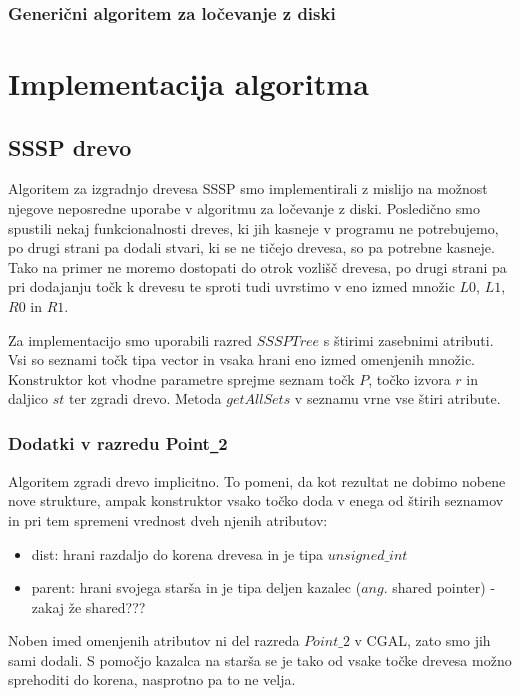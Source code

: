 \documentclass[a4paper, 12pt]{book}
\begin{document}
\subsection{Generični algoritem za ločevanje z diski}

\chapter{Implementacija algoritma}
\label{ch3}


\section{SSSP drevo}

Algoritem za izgradnjo drevesa SSSP smo implementirali z mislijo na možnost njegove neposredne uporabe v algoritmu za ločevanje z diski. Posledično smo spustili nekaj funkcionalnosti dreves, ki jih kasneje v programu ne potrebujemo, po drugi strani pa dodali stvari, ki se ne tičejo drevesa, so pa potrebne kasneje. Tako na primer ne moremo dostopati do otrok vozlišč drevesa, po drugi strani pa pri dodajanju točk k drevesu te sproti tudi uvrstimo v eno izmed množic $L0$, $L1$, $R0$ in $R1$.

Za implementacijo smo uporabili razred $SSSPTree$ s štirimi zasebnimi atributi. Vsi so seznami točk tipa vector in vsaka hrani eno izmed omenjenih množic. Konstruktor kot vhodne parametre sprejme seznam točk $P$, točko izvora $r$ in daljico $st$ ter zgradi drevo. Metoda $getAllSets$ v seznamu vrne vse štiri atribute.

\subsection{Dodatki v razredu Point\texttt{\_}2}
Algoritem zgradi drevo implicitno. To pomeni, da kot rezultat ne dobimo nobene nove strukture, ampak konstruktor vsako točko doda v enega od štirih seznamov in pri tem spremeni vrednost dveh njenih atributov:

\begin{itemize}
\item dist: hrani razdaljo do korena drevesa in je tipa $unsigned\texttt{\_}int$
\item parent: hrani svojega starša in je tipa deljen kazalec ($ang.$ shared pointer) - zakaj že shared???
\end{itemize}

Noben imed omenjenih atributov ni del razreda $Point\texttt{\_}2$ v CGAL, zato smo jih sami dodali. S pomočjo kazalca na starša se je tako od vsake točke drevesa možno sprehoditi do korena, nasprotno pa to ne velja.
\end{document}

